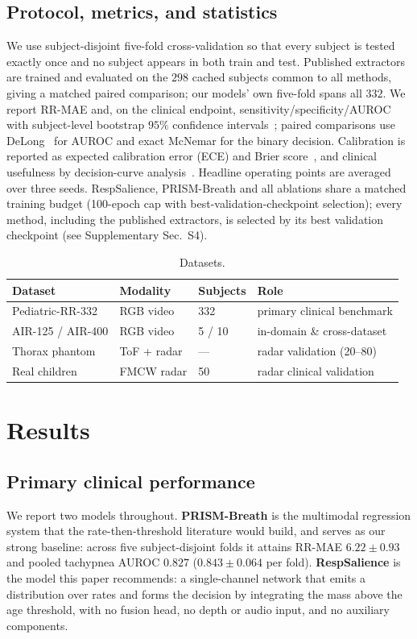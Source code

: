 \documentclass[journal]{IEEEtran}
\begin{document}
\subsection{Protocol, metrics, and statistics}
We use subject-disjoint five-fold cross-validation so that every subject is tested exactly once and no
subject appears in both train and test. Published extractors are trained and evaluated on the $298$
cached subjects common to all methods, giving a matched paired comparison; our models' own five-fold spans
all $332$. We report RR-MAE and, on the clinical endpoint, sensitivity/specificity/AUROC with
subject-level bootstrap $95\%$ confidence intervals~\cite{efron_bootstrap}; paired comparisons use
DeLong~\cite{delong} for AUROC and exact McNemar for the binary decision. Calibration is reported as
expected calibration error (ECE) and Brier score~\cite{brier}, and clinical usefulness by decision-curve
analysis~\cite{vickers_dca}. Headline operating points are averaged over three seeds. RespSalience, PRISM-Breath and all ablations share a matched training
budget (100-epoch cap with best-validation-checkpoint selection); every method, including the published
extractors, is selected by its best validation checkpoint (see Supplementary Sec.~S4).

\begin{table}[!t]\caption{Datasets.}\label{tab:data}\centering\small
\begin{tabular}{@{}llll@{}}\toprule
Dataset & Modality & Subjects & Role\\\midrule
Pediatric-RR-332 & RGB video & 332 & primary clinical benchmark\\
AIR-125 / AIR-400 & RGB video & 5 / 10 & in-domain \& cross-dataset\\
Thorax phantom & ToF + radar & --- & radar validation (20--80)\\
Real children & FMCW radar & 50 & radar clinical validation\\\bottomrule
\end{tabular}\end{table}

\section{Results}
\subsection{Primary clinical performance}\label{sec:primary}
We report two models throughout. \textbf{PRISM-Breath} is the multimodal regression system that the
rate-then-threshold literature would build, and serves as our strong baseline: across five
subject-disjoint folds it attains RR-MAE $6.22\pm0.93$ and pooled tachypnea AUROC $0.827$
($0.843\pm0.064$ per fold). \textbf{RespSalience} is the model this paper recommends: a single-channel
network that emits a distribution over rates and forms the decision by integrating the mass above the
age threshold, with no fusion head, no depth or audio input, and no auxiliary components.
\end{document}
